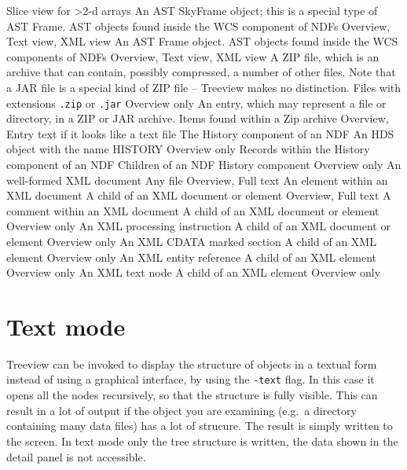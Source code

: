 \documentclass[twoside,11pt]{article}
\newcommand{\xref}[3]{#1}
\renewcommand{\_}{\texttt{\symbol{95}}}
\begin{document}
\begin{itemize}
{    Slice view for >2-d arrays}
\datanode{\iconSkyframe}
   {An AST \xref{SkyFrame}{sun211}{SkyFrame} object;
    this is a special type of AST Frame.}
   {AST objects found inside the WCS component of NDFs}
   {Overview, Text view, XML view}
\datanode{\iconFrame}
   {An AST \xref{Frame}{sun211}{Frame} object.}
   {AST objects found inside the WCS components of NDFs}
   {Overview, Text view, XML view}
\datanode{\iconZipfile}
   {A ZIP file, which is an archive that can contain, possibly compressed, 
   a number of other files.  Note that a JAR file is a special kind of
   ZIP file -- Treeview makes no distinction.}
   {Files with extensions \texttt{.zip} or \texttt{.jar}}
   {Overview only}
\datanode{\iconZipentry}
   {An entry, which may represent a file or directory,
    in a ZIP or JAR archive.}
   {Items found within a Zip archive}
   {Overview, Entry text if it looks like a text file}
\datanode{\iconHistory}
   {The History component of an NDF}
   {An HDS object with the name HISTORY}
   {Overview only}
\datanode{\iconHistoryRecord}
   {Records within the History component of an NDF}
   {Children of an NDF History component}
   {Overview only}
\datanode{\iconXmlDocument}
   {An well-formed XML document}
   {Any file}
   {Overview, Full text}
\datanode{\iconXmlElement}
   {An element within an XML document}
   {A child of an XML document or element}
   {Overview, Full text}
\datanode{\iconXmlComment}
   {A comment within an XML document}
   {A child of an XML document or element}
   {Overview only}
\datanode{\iconXmlPi}
   {An XML processing instruction}
   {A child of an XML document or element}
   {Overview only}
\datanode{\iconXmlCdata}
   {An XML CDATA marked section}
   {A child of an XML element}
   {Overview only}
\datanode{\iconXmlEref}
   {An XML entity reference}
   {A child of an XML element}
   {Overview only}
\datanode{\iconXmlString}
   {An XML text node}
   {A child of an XML element}
   {Overview only}
\end{itemize}


\section{Text mode}

Treeview can be invoked to display the structure of objects
in a textual form instead of using a graphical interface, 
by using the \texttt{-text} flag.
In this case it opens all the nodes recursively, so that the
structure is fully visible.  This can result in a lot of output
if the object you are examining (e.g.\ a directory containing
many data files) has a lot of strucure.  The result is simply
written to the screen.  In text mode only the tree structure
is written, the data shown in the detail panel is not accessible.
\end{document}
